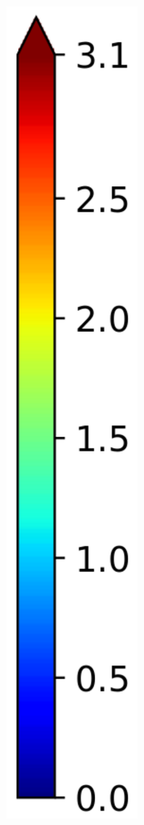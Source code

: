 \documentclass[journal=jpcbfk,manuscript=article]{achemso}
\begin{document}
\begin{figure}[!htb]
\begin{subfigure}{0.085\textwidth}
		\includegraphics[width=\linewidth]{colorbar_jet.pdf}

\end{subfigure}
\end{figure}
\end{document}
